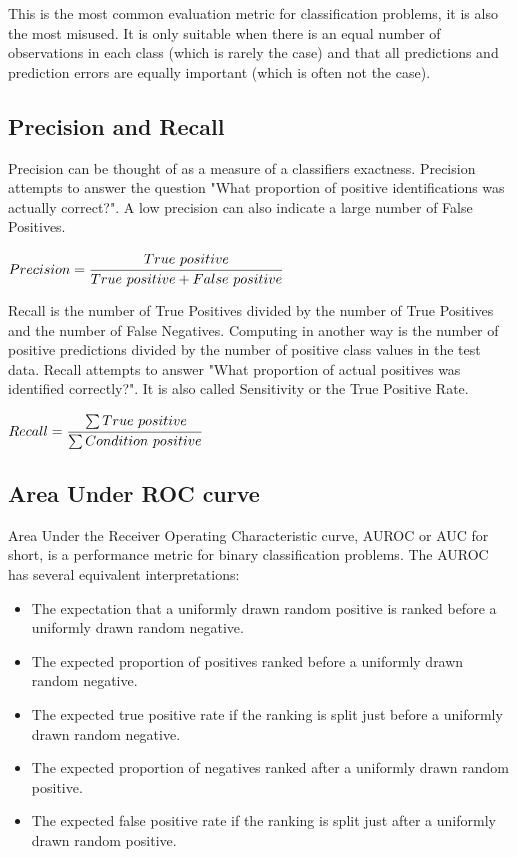 This is the most common evaluation metric for classification problems, it is also the most misused. 
It is only suitable when there is an equal number of observations in each class (which is rarely the case) and that all predictions and prediction errors are equally important (which is often not the case).

\subsection{Precision and Recall}

Precision can be thought of as a measure of a classifiers exactness. Precision attempts to answer the question "What proportion of positive identifications was actually correct?". A low precision can also indicate a large number of False Positives.

\begin{center}
    ${Precision} =  \cfrac{True\ positive}{True\ positive + False\ positive}$
\end{center}

Recall is the number of True Positives divided by the number of True Positives and the number of False Negatives. Computing in another way is the number of positive predictions divided by the number of positive class values in the test data. Recall attempts to answer "What proportion of actual positives was identified correctly?". It is also called Sensitivity or the True Positive Rate.

\begin{center}
    ${Recall} =  \cfrac{\sum True\ positive}{\sum Condition\ positive}$
\end{center}

\subsection{Area Under ROC curve}
\label{ssec:auroc}

Area Under the Receiver Operating Characteristic curve, AUROC or AUC for short, is a performance metric for binary classification problems. The AUROC has several equivalent interpretations:

\begin{itemize}
\item The expectation that a uniformly drawn random positive is ranked before a uniformly drawn random negative.
\item The expected proportion of positives ranked before a uniformly drawn random negative.
\item The expected true positive rate if the ranking is split just before a uniformly drawn random negative.
\item  The expected proportion of negatives ranked after a uniformly drawn random positive.
\item  The expected false positive rate if the ranking is split just after a uniformly drawn random positive.
\end{itemize}

